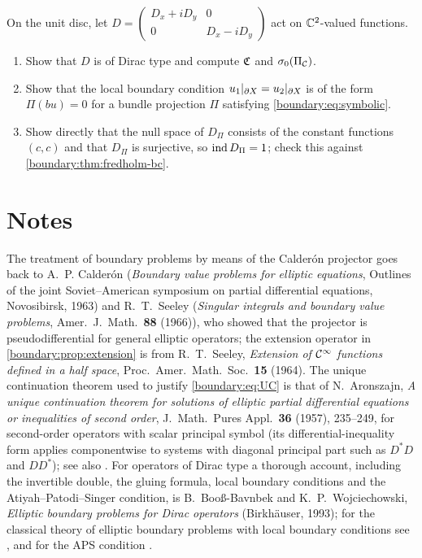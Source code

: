 \begin{exercise}\label{boundary:ex:local-bc}
On the unit disc, let $D=\begin{pmatrix}D_x+iD_y&0\\0&D_x-iD_y\end{pmatrix}$ act on
$\mathbb{C}^2$-valued functions.
\begin{enumerate}[label=(\alph*)]
\item Show that $D$ is of Dirac type and compute $\mathfrak{C}$ and $\sigma_0(\Pi_{\mathcal{C}})$.
\item Show that the local boundary condition $u_1|_{\partial X}=u_2|_{\partial X}$ is of the form
$\Pi(bu)=0$ for a bundle projection $\Pi$ satisfying \eqref{boundary:eq:symbolic}.
\item Show directly that the null space of $D_\Pi$ consists of the constant functions
$(c,c)$ and that $D_\Pi$ is surjective, so $\operatorname{ind} D_\Pi=1$; check this against
\cref{boundary:thm:fredholm-bc}.
\end{enumerate}
\end{exercise}

\section*{Notes}

The treatment of boundary problems by means of the Calder\'on projector goes back to
A.~P. Calder\'on (\emph{Boundary value problems for elliptic equations}, Outlines of the
joint Soviet--American symposium on partial differential equations, Novosibirsk, 1963)
and R.~T.~Seeley (\emph{Singular integrals and boundary value problems}, Amer.\ J.\ Math.\
\textbf{88} (1966)), who showed that the projector is pseudodifferential for general
elliptic operators; the extension operator in \cref{boundary:prop:extension} is from
R.~T.~Seeley, \emph{Extension of $\mathcal{C}^\infty$ functions defined in a half space}, Proc.\ Amer.\
Math.\ Soc.\ \textbf{15} (1964). The unique continuation theorem used to justify
\eqref{boundary:eq:UC} is that of N.~Aronszajn, \emph{A unique continuation theorem for
solutions of elliptic partial differential equations or inequalities of second order},
J.\ Math.\ Pures Appl.\ \textbf{36} (1957), 235--249, for second-order operators with
scalar principal symbol (its differential-inequality form applies componentwise to
systems with diagonal principal part such as $D^*D$ and $DD^*$); see also
\cite[Section~17.2]{Hormander-III}. For operators of Dirac
type a thorough account, including the invertible double, the gluing formula, local
boundary conditions and the Atiyah--Patodi--Singer condition, is B.~Boo{\ss}-Bavnbek and
K.~P.~Wojciechowski, \emph{Elliptic boundary problems for Dirac operators}
(Birkh\"auser, 1993); for the classical theory of elliptic boundary problems with local
boundary conditions see \cite[Chapter~20]{Hormander-III}, and for the APS condition
\cite{Melrose-APS}.

